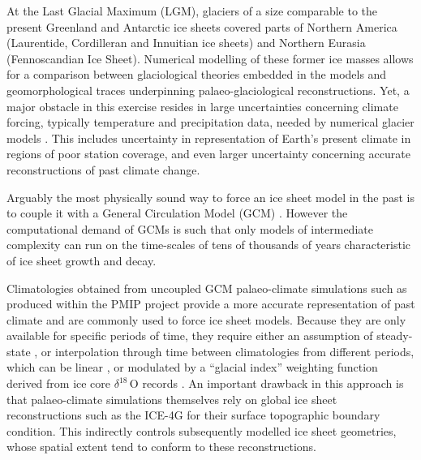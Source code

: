 
\introduction
\label{sec:intro}

At the Last Glacial Maximum (LGM), glaciers of a size comparable to the present Greenland and Antarctic ice sheets covered parts of Northern America (Laurentide, Cordilleran and Innuitian ice sheets) and Northern Eurasia (Fennoscandian Ice Sheet). Numerical modelling of these former ice masses allows for a comparison between glaciological theories embedded in the models and geomorphological traces underpinning palaeo-glaciological reconstructions. Yet, a major obstacle in this exercise resides in large uncertainties concerning climate forcing, typically temperature and precipitation data, needed by numerical glacier models \citep{hebeler-etal-2008}. This includes uncertainty in representation of Earth's present climate in regions of poor station coverage, and even larger uncertainty concerning accurate reconstructions of past climate change.

Arguably the most physically sound way to force an ice sheet model in the past is to couple it with a General Circulation Model (GCM) \citep{yoshimori-etal-2001,calov-etal-2002,abeouchi-etal-2007,charbit-etal-2013}. However the computational demand of GCMs is such that only models of intermediate complexity can run on the time-scales of tens of thousands of years characteristic of ice sheet growth and decay.


Climatologies obtained from uncoupled GCM palaeo-climate simulations such as produced within the PMIP project \citep{joussaume-taylor-1995} provide a more accurate representation of past climate and are commonly used to force ice sheet models. Because they are only available for specific periods of time, they require either an assumption of steady-state \citep{huybrechts-tsiobbel-1996}, or interpolation through time between climatologies from different periods, which can be linear \citep{charbit-etal-2002}, or modulated by a ``glacial index'' weighting function derived from ice core $\delta^{18}$\,O records \citep{marshall-clarke-1999,tarasov-peltier-2004,zweck-huybrechts-2005,gregoire-etal-2012}. An important drawback in this approach is that palaeo-climate simulations themselves rely on global ice sheet reconstructions such as the ICE-4G \citep{peltier-1994} for their surface topographic boundary condition. This indirectly controls subsequently modelled ice sheet geometries, whose spatial extent tend to conform to these reconstructions.

